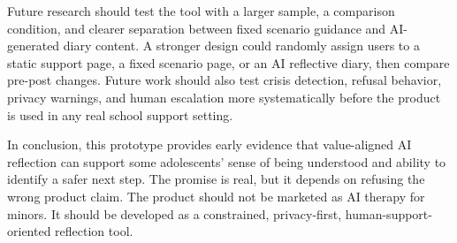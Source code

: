 Future research should test the tool with a larger sample, a comparison condition, and clearer separation between fixed scenario guidance and AI-generated diary content. A stronger design could randomly assign users to a static support page, a fixed scenario page, or an AI reflective diary, then compare pre-post changes. Future work should also test crisis detection, refusal behavior, privacy warnings, and human escalation more systematically before the product is used in any real school support setting.

In conclusion, this prototype provides early evidence that value-aligned AI reflection can support some adolescents' sense of being understood and ability to identify a safer next step. The promise is real, but it depends on refusing the wrong product claim. The product should not be marketed as AI therapy for minors. It should be developed as a constrained, privacy-first, human-support-oriented reflection tool.

\printbibliography


